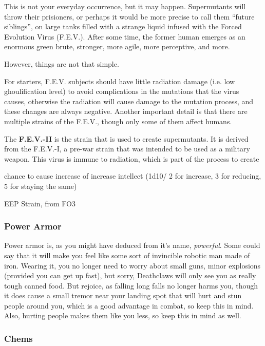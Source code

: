 \documentclass[11pt]{article} %
\begin{document}
This is not your everyday occurrence, but it may happen. Supermutants will throw their prisioners, or perhaps it would be more precise to call them ``future siblings'', on large tanks filled with a strange liquid infused with the Forced Evolution Virus (F.E.V.). After some time, the former human emerges as an enormous green brute, stronger, more agile, more perceptive, and more.

However, things are not that simple.

For starters, F.E.V. subjects should have little radiation damage (i.e. low ghoulification level) to avoid complications in the mutations that the virus causes, otherwise the radiation will cause damage to the mutation process, and these changes are always negative. Another important detail is that there are multiple strains of the F.E.V., though only some of them affect humans. 

The \textbf{F.E.V.-II} is the strain that is used to create supermutants. It is derived from the F.E.V.-I, a pre-war strain that was intended to be used as a military weapon. This virus is immune to radiation, which is part of the process to create 

chance to cause increase of increase intellect (1d10/ 2 for increase, 3 for reducing, 5 for staying the same)



EEP Strain, from FO3


\subsubsection{Power Armor}

Power armor is, as you might have deduced from it's name, \textit{powerful}. Some could say that it will make you feel like some sort of invincible robotic man made of iron. Wearing it, you no longer need to worry about small guns, minor explosions (provided you can get up fast), but sorry, Deathclaws will only see you as really tough canned food. But rejoice, as falling long falls no longer harms you, though it does cause a small tremor near your landing spot that will hurt and stun people around you, which is a good advantage in combat, so keep this in mind. Also, hurting people makes them like you less, so keep this in mind as well.

\subsubsection{Chems}
\end{document}
